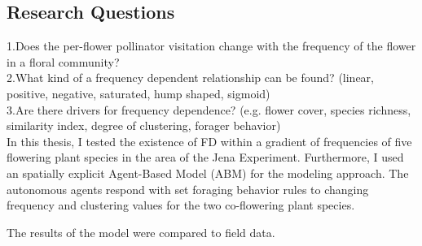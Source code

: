 \subsection{Research Questions}

1.Does the per-flower pollinator visitation change with the frequency of the flower in a floral community? \\

2.What kind of a frequency dependent relationship can be found? (linear, positive, negative, saturated, hump shaped, sigmoid)\\

3.Are there drivers for frequency dependence? (e.g. flower cover, species richness, similarity index, degree of clustering, forager behavior)\\


In this thesis, I tested the existence of FD within a gradient of frequencies of five flowering plant species in the area of the Jena Experiment. Furthermore, I used an spatially explicit Agent-Based Model (ABM) for the modeling approach. The autonomous agents respond with set foraging behavior rules to changing frequency and clustering values for the two co-flowering plant species. 

The results of the model were compared to field data.

